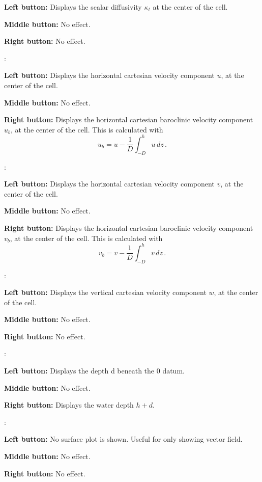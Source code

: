 \begin{list}{}
\begin{list}{}
\item {\bf Left button:} Displays the scalar diffusivity $\kappa_t$ at the center of the cell.
\item {\bf Middle button:} No effect.
\item {\bf Right button:} No effect.
\end{list}
\item {}: 
\begin{list}{}
\item {\bf Left button:} Displays the horizontal cartesian velocity component $u$, at the center of the cell.
\item {\bf Middle button:} No effect.
\item {\bf Right button:} Displays the horizontal cartesian baroclinic velocity component $u_b$, at the center of the cell.
This is calculated with
\[
u_b = u - \frac{1}{D}\int_{-D}^h u\,dz\,.
\]
\end{list}
\item {}: 
\begin{list}{}
\item {\bf Left button:} Displays the horizontal cartesian velocity component $v$, at the center of the cell.
\item {\bf Middle button:} No effect.
\item {\bf Right button:} Displays the horizontal cartesian baroclinic velocity component $v_b$, at the center of the cell.
This is calculated with
\[
v_b = v - \frac{1}{D}\int_{-D}^h v\,dz\,.
\]
\end{list}
\item {}: 
\begin{list}{}
\item {\bf Left button:} Displays the vertical cartesian velocity component $w$, at the center of the cell.
\item {\bf Middle button:} No effect.
\item {\bf Right button:} No effect.
\end{list}
\item {}: 
\begin{list}{}
\item {\bf Left button:} Displays the depth d beneath the 0 datum.
\item {\bf Middle button:} No effect.
\item {\bf Right button:} Displays the water depth $h+d$.
\end{list}
\item {}: 
\begin{list}{}
\item {\bf Left button:} No surface plot is shown.  Useful for only showing vector field.
\item {\bf Middle button:} No effect.
\item {\bf Right button:} No effect.
\end{list}
\end{list}

